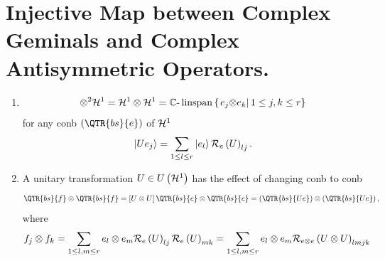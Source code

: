 \section{Injective Map between Complex Geminals and Complex Antisymmetric
Operators.}

\begin{remark}
\begin{enumerate}
\item 
\begin{equation}
\otimes ^{2}{\cal H}^{1}={\cal H}^{1}\otimes {\cal H}^{1}={\Bbb C}\text{-}%
\mathop{\rm linspan}%
\left\{ \left. e_{j}{\small \otimes }e_{k}\right\vert 1\leq j,k\leq
r\right\} 
\end{equation}%
for any conb $\left( \QTR{bs}{e}\right) $ of ${\cal H}^{1}$%
\begin{equation}
\left\vert Ue_{j}\right\rangle =\sum_{1\leq l\leq r}\left\vert
e_{l}\right\rangle {\cal R}_{e}\left( U\right) _{lj}.
\end{equation}

\item A unitary transformation $U\in U\left( {\cal H}^{1}\right) $ has the
effect of changing conb to conb 
\begin{equation}
\QTR{bs}{f}\otimes \QTR{bs}{f}=\left[ U\otimes U\right] \QTR{bs}{e}\otimes 
\QTR{bs}{e}=\left( \QTR{bs}{Ue}\right) \otimes \left( \QTR{bs}{Ue}\right) ,
\end{equation}%
where 
\begin{equation}
f_{j}\otimes f_{k}=\sum_{1\leq l,m\leq r}e_{l}\otimes e_{m}{\cal R}%
_{e}\left( U\right) _{lj}{\cal R}_{e}\left( U\right) _{mk}=\sum_{1\leq
l,m\leq r}e_{l}\otimes e_{m}{\cal R}_{e\otimes e}\left( U\otimes U\right)
_{lmjk}
\end{equation}


\end{enumerate}
\end{remark}
